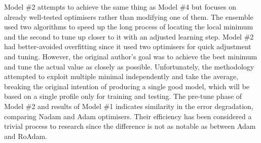 %
%
Model \#2 attempts to achieve the same thing as Model \#4 but focuses on already well-tested optimisers rather than modifying one of them. 
The ensemble used two algorithms to speed up the long process of locating the local minimum and the second to tune up closer to it with an adjusted learning step.
Model \#2 had better-avoided overfitting since it used two optimisers for quick adjustment and tuning.
However, the original author's goal was to achieve the best minimum and tune the actual value as closely as possible.
Unfortunately, the methodology attempted to exploit multiple minimal independently and take the average, breaking the original intention of producing a single good model, which will be based on a single profile only for training and testing.
%
The pre-tune phase of Model \#2 and results of Model \#1 indicates similarity in the error degradation, comparing Nadam and Adam optimisers.
Their efficiency has been considered a trivial process to research since the difference is not as notable as between Adam and RoAdam.


